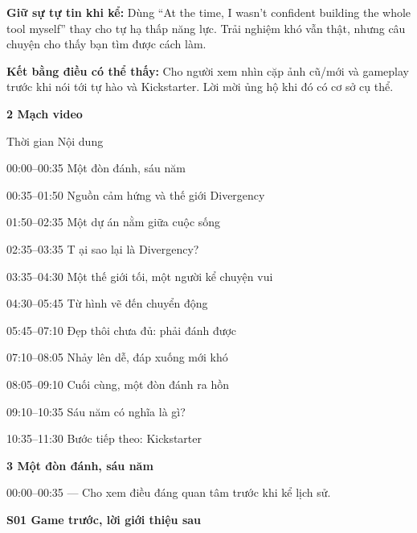 \documentclass[10pt,a4paper]{article}
\begin{document}
\textbf{Giữ sự tự tin khi kể:}  Dùng “At the time, I wasn’t confident building the whole tool myself” thay cho tự hạ thấp năng lực. Trải nghiệm khó vẫn thật, nhưng câu chuyện cho thấy bạn tìm được cách làm.\par

\textbf{Kết bằng điều có thể thấy:}  Cho người xem nhìn cặp ảnh cũ/mới và gameplay trước khi nói tới tự hào và Kickstarter. Lời mời ủng hộ khi đó có cơ sở cụ thể.\par

\textbf{2 Mạch video}\par

Thời gian Nội dung\par

00:00–00:35 Một đòn đánh, sáu năm\par

00:35–01:50 Nguồn cảm hứng và thế giới Divergency\par

01:50–02:35 Một dự án nằm giữa cuộc sống\par

02:35–03:35 T ại sao lại là Divergency?\par

03:35–04:30 Một thế giới tối, một người kể chuyện vui\par

04:30–05:45 Từ hình vẽ đến chuyển động\par

05:45–07:10 Đẹp thôi chưa đủ: phải đánh được\par

07:10–08:05 Nhảy lên dễ, đáp xuống mới khó\par

08:05–09:10 Cuối cùng, một đòn đánh ra hồn\par

09:10–10:35 Sáu năm có nghĩa là gì?\par

10:35–11:30 Bước tiếp theo: Kickstarter\par

\clearpage

\textbf{3 Một đòn đánh, sáu năm}\par

00:00–00:35 — Cho xem điều đáng quan tâm trước khi kể lịch sử.\par

\textbf{S01 Game trước, lời giới thiệu sau}\par
\end{document}
